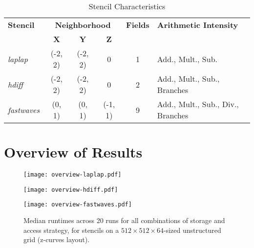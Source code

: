 \begin{table}                                            
\begin{tabular}{l c c c c p{4cm}}
    \hline
    \textbf{Stencil}  &  \multicolumn{3}{c}{\textbf{Neighborhood}}  &  \textbf{Fields}  &  \textbf{Arithmetic Intensity} \\
    \cline{2-4}
    &  \textbf{X}  &  \textbf{Y}  &  \textbf{Z}  & \\
    \hline
	\hline
    \emph{laplap}  &  (-2, 2)  &  (-2, 2)  &  0  &  1  &  Add., Mult., Sub. \\
    \emph{hdiff}  &  (-2, 2)  &  (-2, 2)  &  0  &  2  &  Add., Mult., Sub., Branches \\
    \emph{fastwaves}  &  (0, 1)  &  (0, 1)  &  (-1, 1)  &  9  & Add., Mult., Sub., Div., Branches \\
    \hline
\end{tabular}
\caption{\label{tab:benchmarked-stencils}Stencil Characteristics}
\end{table}

\section{Overview of Results}

\begin{figure}
    
    \texttt{[image: overview-laplap.pdf]}
    
    \vspace{0.5cm}
    
    \texttt{[image: overview-hdiff.pdf]}
    
    \vspace{0.5cm}
    
    \texttt{[image: overview-fastwaves.pdf]}
    
    \caption{\label{fig:storage-access} Median runtimes across 20 runs for all combinations of storage and access strategy, for stencils on a $512\times512\times 64$-sized unstructured grid (z-curves layout).}
\end{figure}

